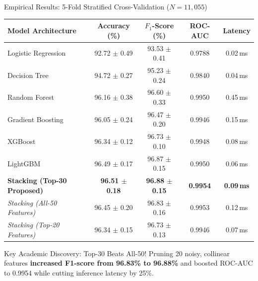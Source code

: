\documentclass[aspectratio=169,10pt]{beamer}
\begin{document}
\begin{frame}{Empirical Results: 5-Fold Stratified Cross-Validation ($N = 11,055$)}
    \begin{table}[h]
        \centering
        \small
        \begin{tabular}{lcccc}
            \toprule
            \textbf{Model Architecture} & \textbf{Accuracy (\%)} & \textbf{$F_1$-Score (\%)} & \textbf{ROC-AUC} & \textbf{Latency} \\
            \midrule
            Logistic Regression & 92.72 $\pm$ 0.49 & 93.53 $\pm$ 0.41 & 0.9788 & 0.02\,ms \\
            Decision Tree & 94.72 $\pm$ 0.27 & 95.23 $\pm$ 0.24 & 0.9840 & 0.04\,ms \\
            Random Forest & 96.16 $\pm$ 0.38 & 96.60 $\pm$ 0.33 & 0.9950 & 0.45\,ms \\
            Gradient Boosting & 96.05 $\pm$ 0.24 & 96.47 $\pm$ 0.20 & 0.9946 & 0.15\,ms \\
            XGBoost & 96.34 $\pm$ 0.12 & 96.73 $\pm$ 0.10 & 0.9948 & 0.08\,ms \\
            LightGBM & 96.49 $\pm$ 0.17 & 96.87 $\pm$ 0.15 & 0.9950 & 0.06\,ms \\
            \textbf{Stacking (Top-30 Proposed)} & \textbf{96.51 $\pm$ 0.18} & \textbf{96.88 $\pm$ 0.15} & \textbf{0.9954} & \textbf{0.09\,ms} \\
            \midrule
            \textit{Stacking (All-50 Features)} & 96.45 $\pm$ 0.20 & 96.83 $\pm$ 0.16 & 0.9953 & 0.12\,ms \\
            \textit{Stacking (Top-20 Features)} & 96.34 $\pm$ 0.15 & 96.73 $\pm$ 0.13 & 0.9946 & 0.07\,ms \\
            \bottomrule
        \end{tabular}
    \end{table}

    \begin{exampleblock}{Key Academic Discovery: Top-30 Beats All-50!}
        Pruning 20 noisy, collinear features \textbf{increased F1-score from 96.83\% to 96.88\%} and boosted ROC-AUC to 0.9954 while cutting inference latency by 25\%.
    \end{exampleblock}
\end{frame}
\end{document}
